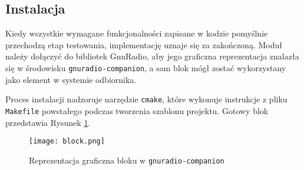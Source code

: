 \subsection{Instalacja}

Kiedy wszystkie wymagane funkcjonalności zapisane w kodzie pomyślnie przechodzą etap testowania, implementację uznaje się za zakończoną.
Moduł należy dołączyć do bibliotek GnuRadio, aby jego graficzna reprezentacja znalazła się w środowisku \texttt{gnuradio-companion}, a sam blok mógł zostać wykorzystany jako element w systemie odbiornika.

Proces instalacji nadzoruje narzędzie \texttt{cmake}, które wykonuje instrukcje z pliku \texttt{Makefile} powstałego podczas tworzenia szablonu projektu. Gotowy blok przedstawia Rysunek \ref{grcblock}. 

\begin{figure}[ht]
\centering
\texttt{[image: block.png]}
\caption{Reprezentacja graficzna bloku w \texttt{gnuradio-companion}}
\label{grcblock}
\end{figure}
